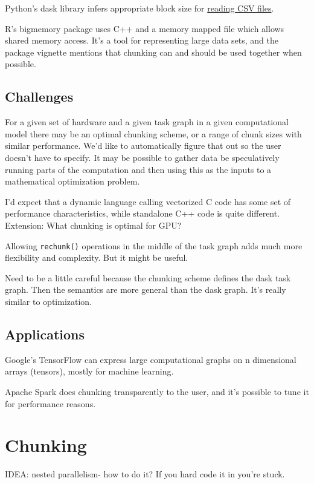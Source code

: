 \documentclass[12pt]{article}
\begin{document}
Python's dask library infers appropriate block size for
\href{https://github.com/dask/dask/pull/1328}{reading CSV files}.

R's bigmemory package uses C++ and a memory mapped file which allows shared
memory access. \cite{kane2010bigmemory} It's a tool for representing large
data sets, and the package vignette mentions that chunking can and should
be used together when possible.

\subsection{Challenges}

For a given set of hardware and a given task graph in a given
computational model there may be
an optimal chunking scheme, or a range of chunk sizes with similar performance.
We'd like to automatically figure that out so the user doesn't have to
specify. It may be possible to gather data be speculatively running parts
of the computation and then using this as the inputs to a 
mathematical optimization problem.

I'd expect that a dynamic language calling vectorized C code has some set
of performance characteristics, while standalone C++ code is quite
different.
Extension: What chunking is optimal for GPU?

Allowing \texttt{rechunk()} operations in the middle of the task graph adds
much more flexibility and complexity. But it might be useful.

Need to be a little careful because the chunking scheme defines the dask
task graph. Then the semantics are more general than the dask graph. It's
really similar to optimization.

\subsection{Applications}

Google's TensorFlow can express large computational graphs on n dimensional
arrays (tensors), mostly for machine learning.

Apache Spark does chunking transparently to the user, and it's possible to
tune it for performance reasons.


\section{Chunking}

IDEA: nested parallelism- how to do it? If you hard code it in you're
stuck.
\end{document}
